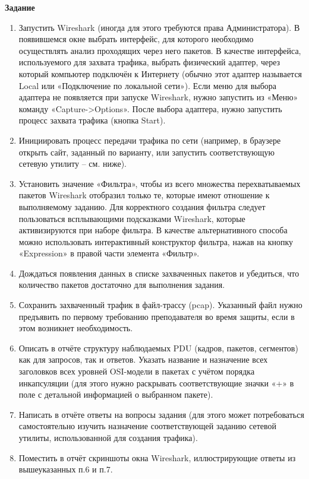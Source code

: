 \textbf{Задание}
\begin{enumerate}
    \item Запустить Wireshark (иногда для этого требуются права 
Администратора). В появившемся окне выбрать интерфейс, для которого 
необходимо осуществлять анализ проходящих через него пакетов. В 
качестве интерфейса, используемого для захвата трафика, выбрать 
физический адаптер, через который компьютер подключён к Интернету 
(обычно этот адаптер называется Local или «Подключение по локальной 
сети»). Если меню для выбора адаптера не появляется при запуске 
Wireshark, нужно запустить из «Меню» команду «Capture->Options».
После выбора адаптера, нужно запустить процесс захвата трафика 
(кнопка Start).
\item Инициировать процесс передачи трафика по сети (например, в браузере 
открыть сайт, заданный по варианту, или запустить соответствующую 
сетевую утилиту – см. ниже).
\item Установить значение «Фильтра», чтобы из всего множества 
перехватываемых пакетов Wireshark отобразил только те, которые имеют 
отношение к выполняемому заданию. Для корректного создания фильтра 
следует пользоваться всплывающими подсказками Wireshark, которые 
активизируются при наборе фильтра. В качестве альтернативного 
способа можно использовать интерактивный конструктор фильтра, 
нажав на кнопку «Expression» в правой части элемента «Фильтр».
\item Дождаться появления данных в списке захваченных пакетов и убедиться, 
что количество пакетов достаточно для выполнения задания.
\item  Сохранить захваченный трафик в файл-трассу (pcap). Указанный файл 
нужно предъявить по первому требованию преподавателя во время 
защиты, если в этом возникнет необходимость.
\item  Описать в отчёте структуру наблюдаемых PDU (кадров, пакетов, 
сегментов) как для запросов, так и ответов. Указать название и 
назначение всех заголовков всех уровней OSI-модели в пакетах с учётом 
порядка инкапсуляции (для этого нужно раскрывать соответствующие 
значки «+» в поле с детальной информацией о выбранном пакете).
\item  Написать в отчёте ответы на вопросы задания (для этого может 
потребоваться самостоятельно изучить назначение соответствующей 
заданию сетевой утилиты, использованной для создания трафика).
\item  Поместить в отчёт скриншоты окна Wireshark, иллюстрирующие ответы 
из вышеуказанных п.6 и п.7.
\end{enumerate}

